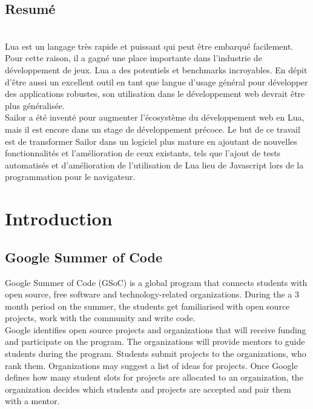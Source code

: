 \documentclass{article}
\begin{document}
	\subsection*{Resumé}\\
Lua est un langage très rapide et puissant qui peut être embarqué facilement. Pour cette raison, il a gagné une place importante dans l'industrie de développement de jeux. Lua a des potentiels et benchmarks incroyables. En dépit d'être aussi un excellent outil en tant que langue d'usage général pour développer des applications robustes, son utilisation dans le développement web devrait être plus généralisée.\\

Sailor a été inventé pour augmenter l'écosystème du développement web en Lua, mais il est encore dans un stage de développement précoce. Le but de ce travail est de transformer Sailor dans un logiciel plus mature en ajoutant de nouvelles fonctionnalités et l'amélioration de ceux existants, tels que l'ajout de tests automatisés et d'amélioration de l'utilisation de Lua lieu de Javascript lors de la programmation pour le navigateur.


	\newpage
	
	\section{Introduction}

	\subsection{Google Summer of Code}
	Google Summer of Code (GSoC) is a global program that connects students with open source, free software and technology-related organizations. During the a 3 month period on the summer, the students get familiarised with open source projects, work with the community and write code. \\

Google identifies open source projects and organizations that will receive funding and participate on the program. The organizations will provide mentors to guide students during the program. Students submit projects to the organizations, who rank them. Organizations may suggest a list of ideas for projects. Once Google defines how many student slots for projects are allocated to an organization, the organization decides which students and projects are accepted and pair them with a mentor.\\
\end{document}
